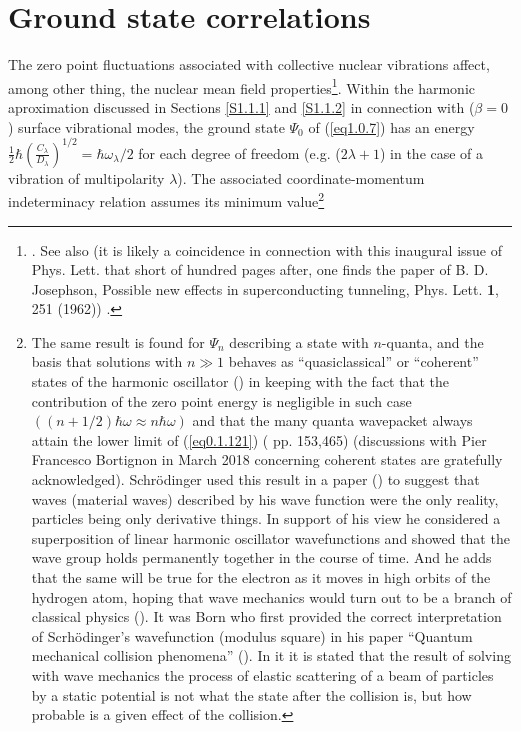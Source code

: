 \section{Ground state correlations}\label{S1.8}
The zero point fluctuations associated with collective nuclear vibrations affect, among other thing, the nuclear mean field properties\footnote{\cite{Gogny:78,Esbensen:83,Reinhard:79,Khodel:82,Barranco:87a,Barranco:85}. See also \cite{Brown:63,Anderson:62} (it is likely a coincidence in connection with this inaugural issue of Phys. Lett. that short of hundred pages after, one finds the paper of B. D. Josephson, Possible new effects in superconducting tunneling, Phys. Lett. \textbf{1}, 251 (1962)) .}. Within the harmonic aproximation discussed in Sections \ref{S1.1.1} and \ref{S1.1.2} in connection with ($\beta=0$) surface vibrational modes, the ground state $\Psi_0$ of (\ref{eq1.0.7}) has an energy $\frac{1}{2}\hbar\left(\frac{C_\lambda}{D_\lambda}\right)^{1/2}=\hbar\omega_\lambda/2$ for each degree of freedom (e.g. ($2\lambda+1$) in the case of a vibration of multipolarity $\lambda$). The associated coordinate-momentum indeterminacy relation assumes its minimum value\footnote{The same result is found for $\Psi_n$ describing a state with $n$-quanta, and the basis that solutions with $n\gg1$ behaves as ``quasiclassical'' or ``coherent'' states of the harmonic oscillator (\cite{Glauber:07}) in keeping with the fact that the contribution of the zero point energy is negligible in such case $((n+1/2)\hbar\omega\approx n\hbar\omega)$ and that the many quanta wavepacket always attain the lower limit of (\ref{eq0.1.121}) (\cite{Basdevant:05} pp. 153,465) (discussions with Pier Francesco Bortignon in March 2018 concerning coherent states are gratefully acknowledged). Schr\"odinger used this result  in a paper (\cite{Schrodinger:26}) to suggest that waves (material waves) described by his wave function were the only reality, particles being only derivative things. In support of his view he considered a superposition of linear harmonic oscillator wavefunctions and showed that the wave group holds permanently together in the course of time. And he adds that the same will be true for the electron as it moves in high orbits of the hydrogen atom, hoping that wave mechanics would turn out to be a branch of classical physics (\cite{Pais:00}). It was Born who first provided the correct interpretation of Scrh\"odinger's wavefunction (modulus square) in his paper ``Quantum mechanical collision phenomena'' (\cite{Born:26}). In it it is stated that the result of solving with wave mechanics the process of elastic scattering of a beam of particles by a static potential is not what the state after the collision is, but how probable is a given effect of the collision.}

